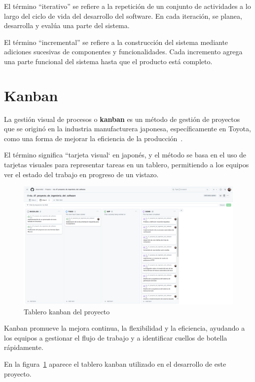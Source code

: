 El término ``iterativo'' se refiere a la repetición de un conjunto de actividades a lo largo del ciclo de vida del
desarrollo del software.
En cada iteración, se planea, desarrolla y evalúa una parte del sistema.

El término ``incremental'' se refiere a la construcción del sistema mediante adiciones sucesivas de componentes y
funcionalidades.
Cada incremento agrega una parte funcional del sistema hasta que el producto está completo.


\section{Kanban}

La gestión visual de procesos o \textbf{kanban}
es un método de gestión de proyectos que se originó en la industria manufacturera japonesa, específicamente en Toyota,
como una forma de mejorar la eficiencia de la producción~\cite{book_anderson_2010}.

El término significa ``tarjeta visual` en japonés, y el método se basa en el uso de tarjetas visuales para
representar tareas en un tablero, permitiendo a los equipos ver el estado del trabajo en progreso de un
vistazo.

\begin{figure}[ht]
    \begin{center}
        \includegraphics[width=\textwidth]{./chapter/3/images/chapter_3.kanban}
        \caption{Tablero kanban del proyecto}
        \label{fig:chapter_3.kanban}
    \end{center}
\end{figure}

Kanban promueve la mejora continua, la flexibilidad y la eficiencia, ayudando a los equipos a gestionar el flujo de
trabajo y a identificar cuellos de botella rápidamente.

En la figura~\ref{fig:chapter_3.kanban} aparece el tablero kanban utilizado en el desarrollo de este proyecto.


